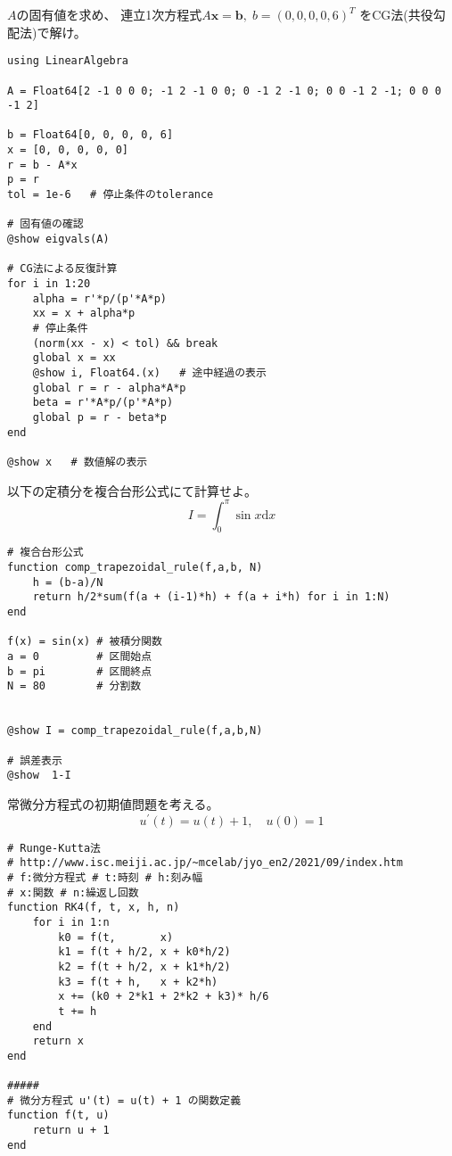 \documentclass[12pt,b5paper]{ltjsarticle}
\begin{document}
$A$の固有値を求め、
連立1次方程式$A\bm{x}=\bm{b},\; b=(0,0,0,0,6)^{T}$
をCG法(共役勾配法)で解け。


\begin{lstlisting}
using LinearAlgebra

A = Float64[2 -1 0 0 0; -1 2 -1 0 0; 0 -1 2 -1 0; 0 0 -1 2 -1; 0 0 0 -1 2]

b = Float64[0, 0, 0, 0, 6]
x = [0, 0, 0, 0, 0]
r = b - A*x
p = r
tol = 1e-6   # 停止条件のtolerance

# 固有値の確認
@show eigvals(A)

# CG法による反復計算
for i in 1:20
    alpha = r'*p/(p'*A*p)
    xx = x + alpha*p
    # 停止条件
    (norm(xx - x) < tol) && break
    global x = xx
    @show i, Float64.(x)   # 途中経過の表示
    global r = r - alpha*A*p
    beta = r'*A*p/(p'*A*p)
    global p = r - beta*p
end

@show x   # 数値解の表示
\end{lstlisting}



\hrulefill

以下の定積分を複合台形公式にて計算せよ。
\begin{equation}
 I = \int_{0}^{\pi} \sin{x} \mathrm{d}x
\end{equation}


\begin{lstlisting}
# 複合台形公式
function comp_trapezoidal_rule(f,a,b, N)
    h = (b-a)/N
    return h/2*sum(f(a + (i-1)*h) + f(a + i*h) for i in 1:N)
end

f(x) = sin(x) # 被積分関数
a = 0         # 区間始点
b = pi        # 区間終点
N = 80        # 分割数


@show I = comp_trapezoidal_rule(f,a,b,N)

# 誤差表示
@show  1-I
\end{lstlisting}

\hrulefill

常微分方程式の初期値問題を考える。
\begin{equation}
 u^{\prime}(t) = u(t)+1,\quad u(0)=1
\end{equation}

\begin{lstlisting}
# Runge-Kutta法
# http://www.isc.meiji.ac.jp/~mcelab/jyo_en2/2021/09/index.htm
# f:微分方程式 # t:時刻 # h:刻み幅
# x:関数 # n:繰返し回数
function RK4(f, t, x, h, n)
    for i in 1:n
        k0 = f(t,       x)
        k1 = f(t + h/2, x + k0*h/2)
        k2 = f(t + h/2, x + k1*h/2)
        k3 = f(t + h,   x + k2*h)
        x += (k0 + 2*k1 + 2*k2 + k3)* h/6
        t += h
    end
    return x
end

#####
# 微分方程式 u'(t) = u(t) + 1 の関数定義
function f(t, u)
    return u + 1
end
\end{lstlisting}
\end{document}
